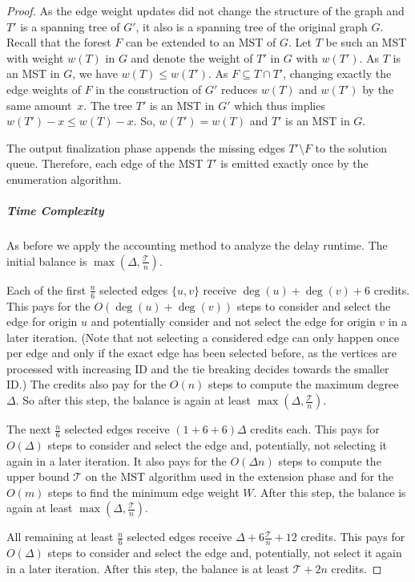 \documentclass[a4paper, USenglish, cleveref, autoref, thm-restate]{lipics-v2021}
\newcommand{\maxdeg}{\Delta}
\newcommand{\totaltime}{\mathcal{T}}
\begin{document}
\begin{proof}
	As the edge weight updates did not change the structure of the graph and $T'$ is a spanning tree of $G'$, it also is a spanning tree of the original graph $G$.
	Recall that the forest $F$ can be extended to an MST of $G$.
	Let $T$ be such an MST with weight $w(T)$ in $G$ and denote the weight of $T'$ in $G$ with $w(T')$.
	As $T$ is an MST in $G$, we have $w(T) \leq w(T')$.
	As $F\subseteq T \cap T'$, changing exactly the edge weights of $F$ in the construction of $G'$ reduces $w(T)$ and $w(T')$ by the same amount~$x$.
	The tree $T'$ is an MST in $G'$ which thus implies $w(T') - x \leq w(T) - x$.
	So, $w(T') = w(T)$ and $T'$ is an MST in $G$.
	
	The output finalization phase appends the missing edges $T' \setminus F$ to the solution queue.
	Therefore, each edge of the MST $T'$ is emitted exactly once by the enumeration algorithm.
	
	\subparagraph*{Time Complexity}
	
	As before we apply the accounting method to analyze the delay runtime.
	The initial balance is $\max(\maxdeg, \frac{\totaltime}{n})$.
	
	Each of the first $\frac{n}{6}$ selected edges $\{u,v\}$ receive $\deg(u) + \deg(v) + 6$ credits.
	This pays for the $O(\deg(u) + \deg(v))$ steps to consider and select the edge for origin $u$ and potentially consider and not select the edge for origin $v$ in a later iteration.
	(Note that not selecting a considered edge can only happen once per edge and only if the exact edge has been selected before, as the vertices are processed with increasing ID and the tie breaking decides towards the smaller ID.)
	The credits also pay for the $O(n)$ steps to compute the maximum degree $\maxdeg$.
	So after this step, the balance is again at least $\max(\maxdeg, \frac{\totaltime}{n})$.
	
	The next $\frac{n}{6}$ selected edges receive $(1 + 6 + 6)\maxdeg$ credits each.
	This pays for $O(\maxdeg)$ steps to consider and select the edge and, potentially, not selecting it again in a later iteration.
	It also pays for the $O(\maxdeg n)$ steps to compute the upper bound $\totaltime$ on the MST algorithm used in the extension phase and for the $O(m)$ steps to find the minimum edge weight $W$.
	After this step, the balance is again at least $\max(\maxdeg, \frac{\totaltime}{n})$.
	
	All remaining at least $\frac{n}{6}$ selected edges receive $\maxdeg + 6\frac{\totaltime}{n} + 12$ credits.
	This pays for $O(\maxdeg)$ steps to consider and select the edge and, potentially, not select it again in a later iteration.
	After this step, the balance is at least $\totaltime + 2n$ credits.
	

\end{proof}
\end{document}
